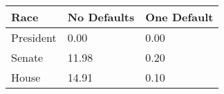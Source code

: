 \begin{tabularx}{.35\textwidth}{lXX}
  \toprule
Race & No \newline Defaults & One \newline Default \\ 
  \midrule
President & 0.00 & 0.00 \\ 
  Senate & 11.98 & 0.20 \\ 
  House & 14.91 & 0.10 \\ 
   \bottomrule
\end{tabularx}
